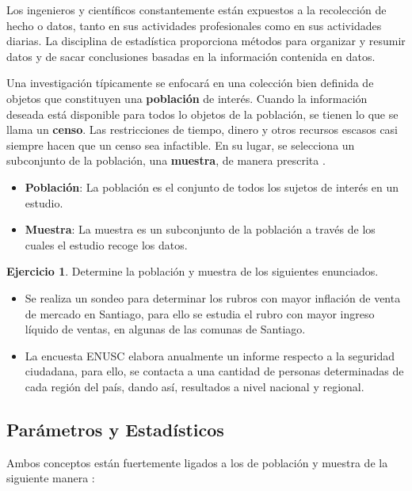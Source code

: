 \documentclass[
  11pt,
]{book}
\providecommand{\tightlist}{%
  \setlength{\itemsep}{0pt}\setlength{\parskip}{0pt}}
\theoremstyle{definition}
\theoremstyle{definition}
\theoremstyle{definition}
\newtheorem{exercise}{Ejercicio}[chapter]
\theoremstyle{definition}
\theoremstyle{remark}
\begin{document}
Los ingenieros y científicos constantemente están expuestos a la recolección de hecho o datos, tanto en sus actividades profesionales como en sus actividades diarias. La disciplina de estadística proporciona métodos para organizar y resumir datos y de sacar conclusiones basadas en la información contenida en datos.

Una investigación típicamente se enfocará en una colección bien definida de objetos que constituyen una \textbf{población} de interés. Cuando la información deseada está disponible para todos lo objetos de la población, se tienen lo que se llama un \textbf{censo}. Las restricciones de tiempo, dinero y otros recursos escasos casi siempre hacen que un censo sea infactible. En su lugar, se selecciona un subconjunto de la población, una \textbf{muestra}, de manera prescrita \citep[página 2]{Devore}.

\begin{itemize}
\tightlist
\item
  \textbf{Población}: La población es el conjunto de todos los sujetos de interés en un estudio.
\item
  \textbf{Muestra}: La muestra es un subconjunto de la población a través de los cuales el estudio recoge los datos.
\end{itemize}

\begin{exercise}
Determine la población y muestra de los siguientes enunciados.
\end{exercise}

\begin{itemize}
\tightlist
\item
  Se realiza un sondeo para determinar los rubros con mayor inflación de venta de mercado en Santiago, para ello se estudia el rubro con mayor ingreso líquido de ventas, en algunas de las comunas de Santiago.
\item
  La encuesta ENUSC elabora anualmente un informe respecto a la seguridad ciudadana, para ello, se contacta a una cantidad de personas determinadas de cada región del país, dando así, resultados a nivel nacional y regional.
\end{itemize}

\subsection{Parámetros y Estadísticos}\label{paruxe1metros-y-estaduxedsticos}

Ambos conceptos están fuertemente ligados a los de población y muestra de la siguiente manera \citep[página 83]{anderson}:
\end{document}
